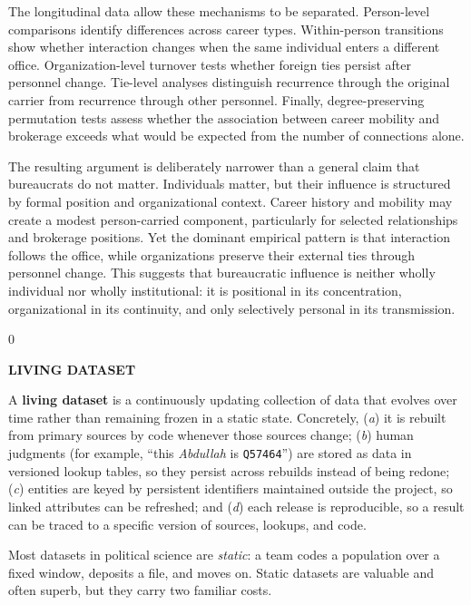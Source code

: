 \documentclass[11pt]{article}
\makeatletter
\renewcommand\section{\@startsection{section}{1}{\z@}{-3.0ex plus -1ex minus -.2ex}{1.5ex plus .2ex}{\normalfont\large\bfseries\MakeUppercase}}
\newenvironment{sidebar}[1]
  {\par\medskip\noindent\begin{lrbox}{0}\begin{minipage}{\dimexpr\linewidth-2\fboxsep\relax}\small\textbf{\MakeUppercase{#1}}\par\smallskip}
  {\end{minipage}\end{lrbox}\colorbox{sidebar}{\usebox{0}}\par\medskip}
\newcommand{\qid}[1]{\texttt{#1}}
\makeatother
\begin{document}
The longitudinal data allow these mechanisms to be separated. Person-level comparisons identify differences across career types. Within-person transitions show whether interaction changes when the same individual enters a different office. Organization-level turnover tests whether foreign ties persist after personnel change. Tie-level analyses distinguish recurrence through the original carrier from recurrence through other personnel. Finally, degree-preserving permutation tests assess whether the association between career mobility and brokerage exceeds what would be expected from the number of connections alone.

The resulting argument is deliberately narrower than a general claim that bureaucrats do not matter. Individuals matter, but their influence is structured by formal position and organizational context. Career history and mobility may create a modest person-carried component, particularly for selected relationships and brokerage positions. Yet the dominant empirical pattern is that interaction follows the office, while organizations preserve their external ties through personnel change. This suggests that bureaucratic influence is neither wholly individual nor wholly institutional: it is positional in its concentration, organizational in its continuity, and only selectively personal in its transmission.


\section{What Is a Living Dataset?}\label{sec:living}

\begin{sidebar}{Living dataset}
A \textbf{living dataset} is a continuously updating collection of data that evolves over time rather than remaining frozen in a static state. Concretely, (\emph{a}) it is rebuilt from primary sources by code whenever those sources change; (\emph{b}) human judgments (for example, ``this \emph{Abdullah} is \qid{Q57464}'') are stored as data in versioned lookup tables, so they persist across rebuilds instead of being redone; (\emph{c}) entities are keyed by persistent identifiers maintained outside the project, so linked attributes can be refreshed; and (\emph{d}) each release is reproducible, so a result can be traced to a specific version of sources, lookups, and code.
\end{sidebar}

Most datasets in political science are \emph{static}: a team codes a population over a fixed window, deposits a file, and moves on. Static datasets are valuable and often superb, but they carry two familiar costs.
\end{document}
